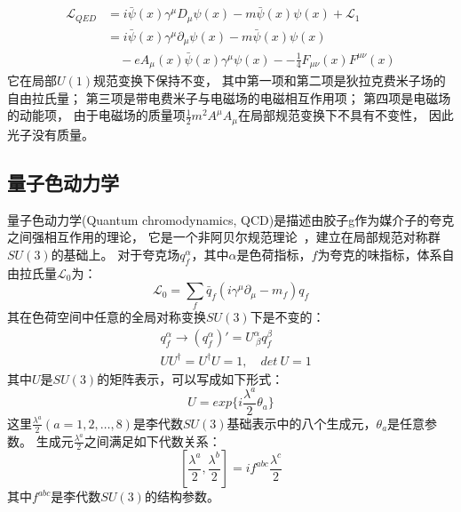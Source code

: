 \begin{equation}
\label{eq:QED8}
\begin{split}
\mathcal{L}_{QED} & =i \bar{\psi}(x) \gamma^{\mu} D_{\mu} \psi(x) - m \bar{\psi}(x) \psi(x) + \mathcal{L}_1\\
& = i \bar{\psi}(x) \gamma^{\mu} \partial_{\mu} \psi(x) - m \bar{\psi}(x) \psi(x) \\
&\quad - e A_{\mu}(x)\bar{\psi}(x) \gamma^{\mu} \psi(x) - -\frac{1}{4}F_{\mu\nu}(x)F^{\mu\nu}(x)
\end{split}
\end{equation}
它在局部$U(1)$规范变换下保持不变，
其中第一项和第二项是狄拉克费米子场的自由拉氏量；
第三项是带电费米子与电磁场的电磁相互作用项；
第四项是电磁场的动能项，
由于电磁场的质量项$\frac{1}{2}m^2A^{\mu}A_{\mu}$在局部规范变换下不具有不变性，
因此光子没有质量。



\subsection{量子色动力学}
\label{sec:QCD}
量子色动力学(Quantum chromodynamics, QCD)是描述由胶子g作为媒介子的夸克之间强相互作用的理论，
它是一个非阿贝尔规范理论~\cite{SM0}，建立在局部规范对称群$SU(3)$的基础上。
对于夸克场$q_f^{\alpha}$，其中$\alpha$是色荷指标，$f$为夸克的味指标，体系自由拉氏量$\mathcal{L}_0$为：
\begin{equation} 
\label{eq:QCD1}
\mathcal{L}_0=\sum_f \bar{q}_f (i\gamma^{\mu}\partial_{\mu}-m_f)q_f
\end{equation}
其在色荷空间中任意的全局对称变换$SU(3)$下是不变的：
\begin{equation} 
\label{eq:QCD2}
 \begin{split}
 &  q_f^{\alpha} \rightarrow (q_f^{\alpha})'=U^{\alpha}_{~\beta}q_f^{\beta}  \\
 & UU^{\dagger} =U^{\dagger}U=1, \quad det~U=1
 \end{split}
\end{equation}
其中$U$是$SU(3)$的矩阵表示，可以写成如下形式：
\begin{equation} 
\label{eq:QCD3}
U=exp\Bigg\{ i\frac{\lambda^{a}}{2}\theta_a \Bigg\} 
\end{equation}
这里$\frac{\lambda^{a}}{2}(a=1,2,\dots,8)$是李代数$SU(3)$基础表示中的八个生成元，$\theta_a$是任意参数。
生成元$\frac{\lambda^{a}}{2}$之间满足如下代数关系：
\begin{equation} 
\label{eq:QCD4}
\left[ \frac{\lambda^{a}}{2}, \frac{\lambda^{b}}{2} \right]=if^{abc}\frac{\lambda^{c}}{2}
\end{equation}
其中$f^{abc}$是李代数$SU(3)$的结构参数。

